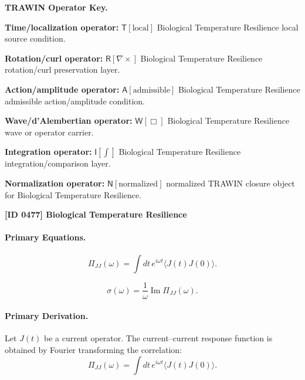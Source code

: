 \par\vspace{0.45\baselineskip}
\noindent\begin{minipage}[t]{\linewidth}
\begingroup
\small
\raggedright
\textbf{TRAWIN Operator Key.}\par
\noindent\textbf{Time/localization operator:} $\mathsf{T}\!\left[\mathrm{local}\right]$ Biological Temperature Resilience local source condition.\par
\noindent\textbf{Rotation/curl operator:} $\mathsf{R}\!\left[\nabla\times\right]$ Biological Temperature Resilience rotation/curl preservation layer.\par
\noindent\textbf{Action/amplitude operator:} $\mathsf{A}\!\left[\mathrm{admissible}\right]$ Biological Temperature Resilience admissible action/amplitude condition.\par
\noindent\textbf{Wave/d'Alembertian operator:} $\mathsf{W}\!\left[\Box\right]$ Biological Temperature Resilience wave or operator carrier.\par
\noindent\textbf{Integration operator:} $\mathsf{I}\!\left[\int\right]$ Biological Temperature Resilience integration/comparison layer.\par
\noindent\textbf{Normalization operator:} $\mathsf{N}\!\left[\mathrm{normalized}\right]$ normalized TRAWIN closure object for Biological Temperature Resilience.\par
\endgroup
\end{minipage}

\clearpage
\noindent\textbf{[ID 0477] Biological Temperature Resilience}\par
\vspace{0.35em}
\paragraph{Primary Equations.}
\begin{equation}
\Pi_{JJ}(\omega)
=
\int
dt\,
e^{i\omega t}
\langle J(t)J(0)\rangle .
\end{equation}

\begin{equation}
\sigma(\omega)
=
\frac{1}{\omega}
\operatorname{Im}\Pi_{JJ}(\omega).
\end{equation}

\paragraph{Primary Derivation.}
Let $J(t)$ be a current operator.  
The current--current response function is obtained by Fourier transforming the correlation:
\begin{equation}
\Pi_{JJ}(\omega)
=
\int
dt\,
e^{i\omega t}
\langle J(t)J(0)\rangle .
\end{equation}

